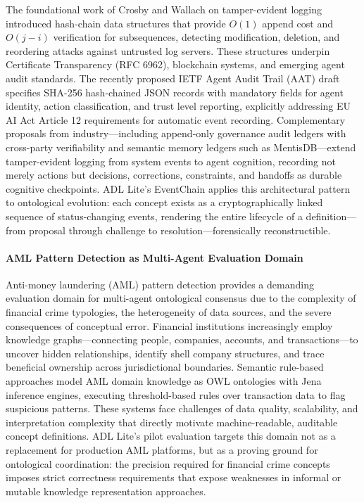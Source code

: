 The foundational work of Crosby and Wallach on tamper-evident logging introduced hash-chain data structures that provide \(O(1)\) append cost and \(O(j-i)\) verification for subsequences, detecting modification, deletion, and reordering attacks against untrusted log servers\cite{ref27}. These structures underpin Certificate Transparency (RFC 6962)\cite{ref28}, blockchain systems, and emerging agent audit standards. The recently proposed IETF Agent Audit Trail (AAT) draft specifies SHA-256 hash-chained JSON records with mandatory fields for agent identity, action classification, and trust level reporting, explicitly addressing EU AI Act Article 12 requirements for automatic event recording\cite{ref29}. Complementary proposals from industry---including append-only governance audit ledgers with cross-party verifiability\cite{ref30} and semantic memory ledgers such as MentisDB\cite{ref31}---extend tamper-evident logging from system events to agent cognition, recording not merely actions but decisions, corrections, constraints, and handoffs as durable cognitive checkpoints. ADL Lite's EventChain applies this architectural pattern to ontological evolution: each concept exists as a cryptographically linked sequence of status-changing events, rendering the entire lifecycle of a definition---from proposal through challenge to resolution---forensically reconstructible.

\paragraph{AML Pattern Detection as Multi-Agent Evaluation Domain}\label{aml-pattern-detection-as-multi-agent-evaluation-domain}

Anti-money laundering (AML) pattern detection provides a demanding evaluation domain for multi-agent ontological consensus due to the complexity of financial crime typologies, the heterogeneity of data sources, and the severe consequences of conceptual error. Financial institutions increasingly employ knowledge graphs---connecting people, companies, accounts, and transactions---to uncover hidden relationships, identify shell company structures, and trace beneficial ownership across jurisdictional boundaries\cite{ref32}. Semantic rule-based approaches model AML domain knowledge as OWL ontologies with Jena inference engines, executing threshold-based rules over transaction data to flag suspicious patterns\cite{ref33}. These systems face challenges of data quality, scalability, and interpretation complexity that directly motivate machine-readable, auditable concept definitions\cite{ref32}. ADL Lite's pilot evaluation targets this domain not as a replacement for production AML platforms, but as a proving ground for ontological coordination: the precision required for financial crime concepts imposes strict correctness requirements that expose weaknesses in informal or mutable knowledge representation approaches.

